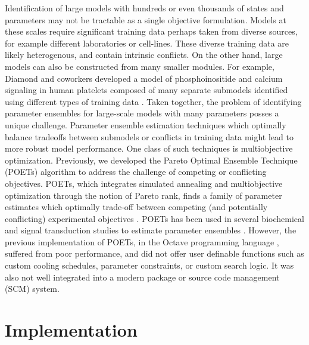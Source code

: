 \documentclass{bmcart}
\begin{document}
Identification of large models with hundreds or even thousands of states and parameters may not be tractable as a single objective formulation.
Models at these scales require significant training data perhaps taken from diverse sources, for example different laboratories or cell-lines.
These diverse training data are likely heterogenous, and contain intrinsic conflicts.
On the other hand, large models can also be constructed from many smaller modules.
For example, Diamond and coworkers developed a model of phosphoinositide and calcium signaling in human platelets composed of many
separate submodels identified using different types of training data \cite{Purvis:2008}.
Taken together, the problem of identifying parameter ensembles for large-scale models with many parameters posses a unique challenge.
Parameter ensemble estimation techniques which optimally balance tradeoffs between submodels or conflicts in training data
might lead to more robust model performance. One class of such techniques is multiobjective optimization.
Previously, we developed the Pareto Optimal Ensemble Technique (POETs) algorithm to address the challenge of competing or conflicting objectives.
POETs, which integrates simulated annealing and multiobjective optimization through the notion of Pareto rank, finds a family of parameter estimates which optimally trade-off between
competing (and potentially conflicting) experimental objectives \cite{Song:2010aa}.
POETs has been used in several biochemical and signal transduction studies to estimate parameter ensembles \cite{Song:2009aa,Lequieu:2011aa}.
However, the previous implementation of POETs, in the Octave programming language \cite{Octave}, suffered from poor performance, and did not offer user definable
functions such as custom cooling schedules, parameter constraints, or custom search logic. It was also not well integrated into a modern package or
source code management (SCM) system.

\section*{Implementation}
\end{document}
